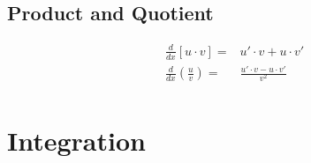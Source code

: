 \documentclass[10pt]{article}
\begin{document}
\begin{multicols}{2}
  \subsection*{Product and Quotient}

  \begin{align*}
     & \frac{d}{dx} [u \cdot v] =                & u' \cdot v + u \cdot v'             \\
     & \frac{d}{dx} \left( \frac{u}{v} \right) = & \frac{u' \cdot v - u \cdot v'}{v^2} \\
  \end{align*}

\end{multicols}

\newpage

\section*{Integration}
\end{document}

